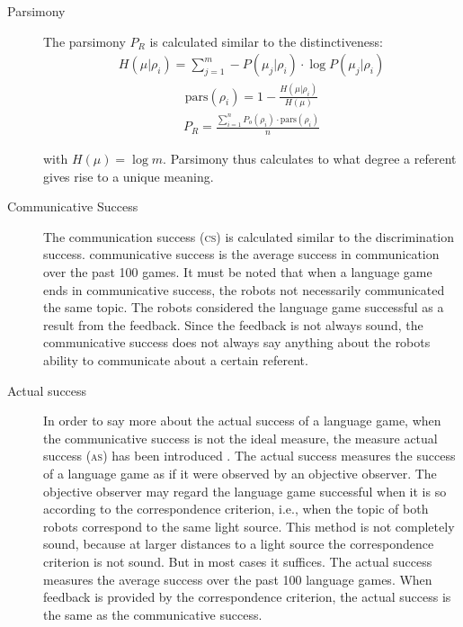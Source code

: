 \begin{description}
\item[Parsimony] The parsimony $P_R$ is calculated similar to the distinctiveness:
\begin{eqnarray}
H(\mu|\rho_i)=\sum_{j=1}^m -P(\mu_j|\rho_i) \cdot \log P(\mu_j|\rho_i)
\end{eqnarray}
\begin{eqnarray}
\mbox{pars}(\rho_i)=1-\frac{H(\mu|\rho_i)}{H(\mu)}
\end{eqnarray}
\begin{eqnarray}
P_R=\frac{\sum_{i=1}^n P_o(\rho_i) \cdot \mbox{pars}(\rho_i)}{n}
\end{eqnarray}


with  $H(\mu)= \log m$. Parsimony thus calculates to what degree a referent gives rise to a unique meaning.

\item[Communicative Success] The communication success
{\scshape (cs)} is calculated similar to the discrimination success. communicative success is the average success in communication
over the past 100 games. It must be noted that when a language
game ends in communicative success, the robots not necessarily
communicated the same topic. The robots considered the language
game successful as a result from the feedback. Since the feedback is not always sound, the communicative success does not always say anything about
the robots ability to communicate about a certain referent.

\item[Actual success] In order to say more about the
actual success of a language game, when the communicative success is not the ideal measure, the measure actual success {\scshape (as)} has been introduced \citep{vogt:1998b}. The actual success
measures the success of a language game as if it were observed
by an objective observer. The objective observer may regard the language game successful when it is so according to the correspondence criterion, i.e., when the topic of both robots correspond to the same light source. This method is not completely sound, because at larger distances to a light source the correspondence criterion is not sound. But in most cases it suffices. The actual success measures the
average success over the past 100 language games. When feedback is provided by the correspondence criterion, the actual success is the same as the communicative success.


\end{description}
